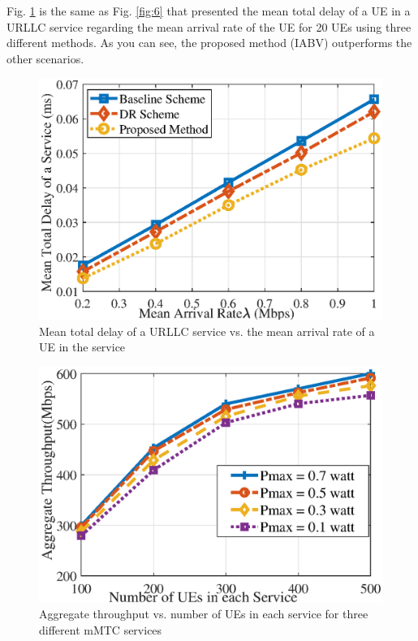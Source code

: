 \documentclass[lettersize,journal]{IEEEtran}
\begin{document}
Fig. \ref{fig:7} is the same as Fig. \ref{fig:6} that presented the mean total delay of a UE in a URLLC service regarding the mean arrival rate of the UE for 20 UEs using three different methods. As you can see, the proposed method (IABV) outperforms the other scenarios.
\begin{figure}%
  \centering
    \includegraphics[scale = 0.5]{fig/delay1_newn.eps}
    \caption{Mean total delay of a URLLC service vs. the mean arrival rate of a UE in the service}
  \label{fig:7}
\end{figure}
\begin{figure}%
  \centering
       \includegraphics[scale = 0.5]{fig/AmmTCpowern.eps}
  \caption{Aggregate throughput vs. number of UEs in each service for three different mMTC services}
  \label{fig:8}
\end{figure}
\end{document}
